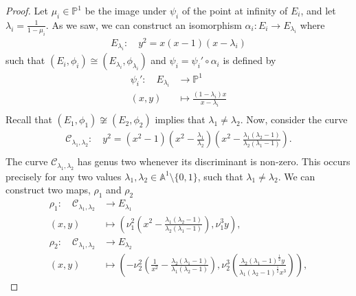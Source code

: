 \documentclass[10pt,a4paper]{amsart}
\newcommand{\calC}{\mathcal{C}}
\begin{document}
\begin{proof}
Let $\mu_i\in\mathbb{P}^1$ be the image under $\psi_i$ of the point at infinity of $E_i$, and let $\lambda_i=\tfrac{1}{1-\mu_i}$. As we saw, we can construct an isomorphism $\alpha_i:E_i\rightarrow E_{\lambda_i}$ where
\begin{align*}
 E_{\lambda_i}\colon\quad y^2=x(x-1)(x-\lambda_i)
\end{align*}
such that $(E_i,\phi_i)\cong(E_{\lambda_i},\phi_{\lambda_i})$ and $\psi_i=\psi_i'\circ\alpha_i$ is defined by
\begin{align*}
\psi_i'\colon\quad E_{\lambda_i}&\longrightarrow\mathbb{P}^1\\
(x,y)&\longmapsto\frac{(1-\lambda_i)x}{x-\lambda_i}\\
\end{align*}
Recall that $(E_1,\phi_1)\not\cong(E_2,\phi_2)$ implies that $\lambda_1\neq\lambda_2$. Now, consider the curve
\begin{align*}
\calC_{\lambda_1,\lambda_2}\colon\quad y^2=(x^2-1)\left(x^2-\frac{\lambda_1}{\lambda_2}\right)\left(x^2-\frac{\lambda_1(\lambda_2-1)}{\lambda_2(\lambda_1-1)}\right).\\
\end{align*}
The curve $\calC_{\lambda_1,\lambda_2}$ has genus two whenever its discriminant is non-zero. This occurs precisely for any two values $\lambda_1,\lambda_2\in \mathbb{A}^1\setminus\{0,1\}$, such that $\lambda_1\neq\lambda_2$. We can construct two maps, $\rho_1$ and $\rho_2$
\begin{align*}
\rho_1\colon\quad \calC_{\lambda_1,\lambda_2} &\longrightarrow E_{\lambda_1} \\
(x,y) &\longmapsto\left(\nu_1^2\left(x^2-\frac{\lambda_1(\lambda_2-1)}{\lambda_2(\lambda_1-1)}\right),\nu_1^3 y\right),\\
\rho_2\colon\quad \calC_{\lambda_1,\lambda_2} &\longrightarrow E_{\lambda_2} \\
(x,y) &\longmapsto\left(-\nu_2^2\left(\frac{1}{x^2}-\frac{\lambda_2(\lambda_1-1)}{\lambda_1(\lambda_2-1)}\right),\nu_2^3\left( \frac{\lambda_2(\lambda_1-1)^{\frac{1}{2}}y}{\lambda_1(\lambda_2-1)^{\frac{1}{2}}x^3}\right)\right),
\end{align*}


\end{proof}
\end{document}

